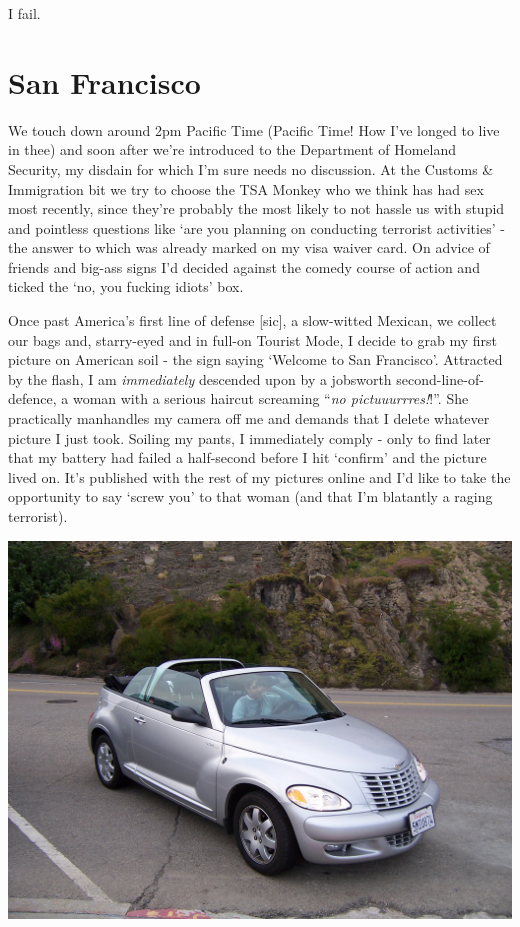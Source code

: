 \documentclass[a5paper,titlepage,11pt]{book}
\begin{document}
I fail.

\section*{San Francisco}
We touch down around 2pm Pacific Time (Pacific Time! How I've longed to live in thee) and soon after we're introduced to the Department of Homeland Security, my disdain for which I'm sure needs no discussion.  At the Customs \& Immigration bit we try to choose the TSA Monkey who we think has had sex most recently, since they're probably the most likely to not hassle us with stupid and pointless questions like `are you planning on conducting terrorist activities' - the answer to which was already marked on my visa waiver card.  On advice of friends and big-ass signs I'd decided against the comedy course of action and ticked the `no, you fucking idiots' box.

Once past America's first line of defense [sic], a slow-witted Mexican, we collect our bags and, starry-eyed and in full-on Tourist Mode, I decide to grab my first picture on American soil - the sign saying `Welcome to San Francisco'.  Attracted by the flash, I am \emph{immediately} descended upon by a jobsworth second-line-of-defence, a woman with a serious haircut screaming ``\emph{no pictuuurrres!}!''.  She practically manhandles my camera off me and demands that I delete whatever picture I just took. Soiling my pants, I immediately comply - only to find later that my battery had failed a half-second before I hit `confirm' and the picture lived on.  It's published with the rest of my pictures online and I'd like to take the opportunity to say `screw you' to that woman (and that I'm blatantly a raging terrorist).

\begin{center}\includegraphics[width=\textwidth]{gfx/100_1064}\end{center}
\end{document}
